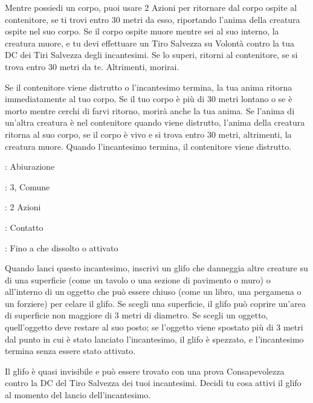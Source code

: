 \begin{multicols}{2}
Mentre possiedi un corpo, puoi usare 2 Azioni per ritornare dal corpo ospite al contenitore, se ti trovi entro 30 metri da esso, riportando l'anima della creatura ospite nel suo corpo. Se il corpo ospite muore mentre sei al suo interno, la creatura muore, e tu devi effettuare un Tiro Salvezza su Volontà contro la tua DC dei Tiri Salvezza degli incantesimi. Se lo superi, ritorni al contenitore, se si trova entro 30 metri da te. Altrimenti, morirai.

Se il contenitore viene distrutto o l'incantesimo termina, la tua anima ritorna immediatamente al tuo corpo. Se il tuo corpo è più di 30 metri lontano o se è morto mentre cerchi di farvi ritorno, morirà anche la tua anima. Se l'anima di un'altra creatura è nel contenitore quando viene distrutto, l'anima della creatura ritorna al suo corpo, se il corpo è vivo e si trova entro 30 metri, altrimenti, la creatura muore. Quando l'incantesimo termina, il contenitore viene distrutto.

\noindent\colorbox{OBSSgold!10}{
\begin{minipage}{0.95\linewidth}
\begin{description}[noitemsep, topsep=0pt, parsep=0pt, partopsep=0pt, leftmargin=0cm, labelwidth=1.3cm]
	\item[\textbf{Lista}]: Abiurazione
	\item[\textbf{Livello}]: 3, Comune
	\item[\textbf{Lancio}]: 2 Azioni
	\item[\textbf{Gittata}]: Contatto
	\item[\textbf{Durata}]: Fino a che dissolto o attivato
\end{description}
\end{minipage}}\smallskip

Quando lanci questo incantesimo, inscrivi un glifo che danneggia altre creature su di una superficie (come un tavolo o una sezione di pavimento o muro) o all'interno di un oggetto che può essere chiuso (come un libro, una pergamena o un forziere) per celare il glifo. Se scegli una superficie, il glifo può coprire un'area di superficie non maggiore di 3 metri di diametro. Se scegli un oggetto, quell'oggetto deve restare al suo posto; se l'oggetto viene spostato più di 3 metri dal punto in cui è stato lanciato l'incantesimo, il glifo è spezzato, e l'incantesimo termina senza essere stato attivato.

Il glifo è quasi invisibile e può essere trovato con una prova Consapevolezza contro la DC del Tiro Salvezza dei tuoi incantesimi. Decidi tu cosa attivi il glifo al momento del lancio dell'incantesimo.


\end{multicols}
